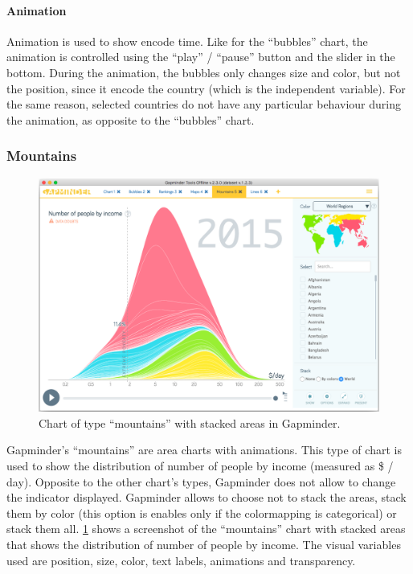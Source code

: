 \paragraph{Animation}
Animation is used to show encode time.
Like for the ``bubbles'' chart, the animation is controlled using the ``play'' / ``pause'' button and the slider in the bottom.
During the animation, the bubbles only changes size and color, but not the position, since it encode the country (which is the independent variable).
For the same reason, selected countries do not have any particular behaviour during the animation, as opposite to the ``bubbles'' chart.


\subsubsection{Mountains}
\begin{figure}[h]
	\centering
	\includegraphics[width=0.95\columnwidth]{figures/mountains}
	\caption{Chart of type ``mountains'' with stacked areas in Gapminder.}
	\label{fig:mountains}
\end{figure}

Gapminder's ``mountains'' are area charts with animations.
This type of chart is used to show the distribution of number of people by income (measured as \$ / day).
Opposite to the other chart's types, Gapminder does not allow to change the indicator displayed.
Gapminder allows to choose not to stack the areas, stack them by color (this option is enables only if the colormapping is categorical) or stack them all.
\cref{fig:mountains} shows a screenshot of the ``mountains'' chart with stacked areas that shows the distribution of number of people by income.
The visual variables used are position, size, color, text labels, animations and transparency.

